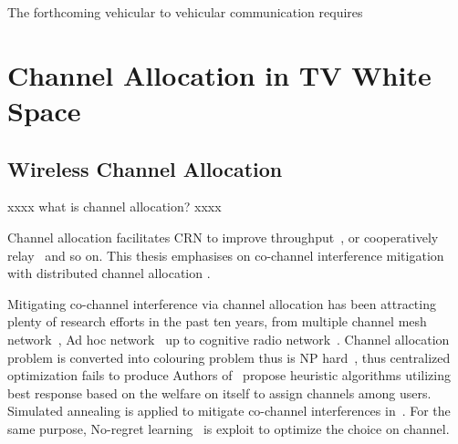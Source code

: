 The forthcoming vehicular to vehicular communication requires






\section{Channel Allocation in TV White Space}
\subsection{Wireless Channel Allocation}
xxxx what is channel allocation? xxxx

Channel allocation facilitates CRN to improve throughput~\cite{channelAllocation_throughput_12wcnc}, or cooperatively relay~\cite{channelAllocation_relay_2010ICASSP} and so on.
This thesis emphasises on co-channel interference mitigation with distributed channel allocation . 

Mitigating co-channel interference via channel allocation has been attracting plenty of research efforts in the past ten years, from multiple channel mesh network~\cite{Hyacinth}, Ad hoc network~\cite{Babadi08, Ko_DistributedCA} up to cognitive radio network~\cite{SA_CA_TVWS_2012crowncom,qlearning_huang}. 
Channel allocation problem is converted into colouring problem thus is NP hard~\cite{Hyacinth}, thus centralized optimization fails to produce
Authors of~\cite{Babadi08, Ko_DistributedCA} propose heuristic algorithms utilizing best response based on the welfare on itself to assign channels among users.
Simulated annealing is applied to mitigate co-channel interferences in~\cite{SA_CA_TVWS_2012crowncom}.
For the same purpose, No-regret learning~\cite{qlearning_huang, hart00correlatedeq} is exploit to optimize the choice on channel.

